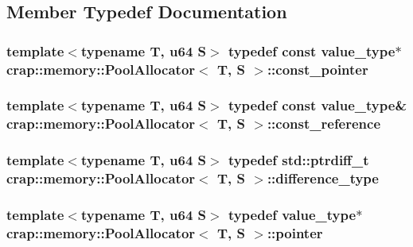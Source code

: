 \subsection{Member Typedef Documentation}
\hypertarget{classcrap_1_1memory_1_1_pool_allocator_afb622f1279d38037c15d9d4edfcf8b73}{
\subsubsection[{const\-\_\-pointer}]{\setlength{\rightskip}{0pt plus 5cm}template$<$typename T, u64 S$>$ typedef const {\bf value\-\_\-type}$\ast$ {\bf crap\-::memory\-::\-Pool\-Allocator}$<$ T, S $>$\-::{\bf const\-\_\-pointer}}}\label{classcrap_1_1memory_1_1_pool_allocator_afb622f1279d38037c15d9d4edfcf8b73}
\hypertarget{classcrap_1_1memory_1_1_pool_allocator_ad3705c8900e2a4bff380986d92ae6f7e}{
\subsubsection[{const\-\_\-reference}]{\setlength{\rightskip}{0pt plus 5cm}template$<$typename T, u64 S$>$ typedef const {\bf value\-\_\-type}\& {\bf crap\-::memory\-::\-Pool\-Allocator}$<$ T, S $>$\-::{\bf const\-\_\-reference}}}\label{classcrap_1_1memory_1_1_pool_allocator_ad3705c8900e2a4bff380986d92ae6f7e}
\hypertarget{classcrap_1_1memory_1_1_pool_allocator_a8cfc527593aee68d4e92445e656f3a7b}{
\subsubsection[{difference\-\_\-type}]{\setlength{\rightskip}{0pt plus 5cm}template$<$typename T, u64 S$>$ typedef std\-::ptrdiff\-\_\-t {\bf crap\-::memory\-::\-Pool\-Allocator}$<$ T, S $>$\-::{\bf difference\-\_\-type}}}\label{classcrap_1_1memory_1_1_pool_allocator_a8cfc527593aee68d4e92445e656f3a7b}
\hypertarget{classcrap_1_1memory_1_1_pool_allocator_a4de0cc524be4b7f4fd16c1ac54383c71}{
\subsubsection[{pointer}]{\setlength{\rightskip}{0pt plus 5cm}template$<$typename T, u64 S$>$ typedef {\bf value\-\_\-type}$\ast$ {\bf crap\-::memory\-::\-Pool\-Allocator}$<$ T, S $>$\-::{\bf pointer}}}\label{classcrap_1_1memory_1_1_pool_allocator_a4de0cc524be4b7f4fd16c1ac54383c71}

